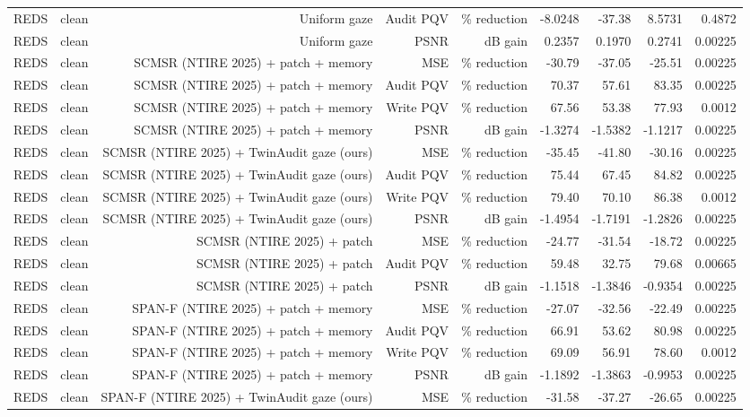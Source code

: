 \begin{table}[t]
\begin{tabular}{llrrrrrrr}
REDS & clean & Uniform gaze & Audit PQV & \% reduction & -8.0248 & -37.38 & 8.5731 & 0.4872 \\
REDS & clean & Uniform gaze & PSNR & dB gain & 0.2357 & 0.1970 & 0.2741 & 0.00225 \\
REDS & clean & SCMSR (NTIRE 2025) + patch + memory & MSE & \% reduction & -30.79 & -37.05 & -25.51 & 0.00225 \\
REDS & clean & SCMSR (NTIRE 2025) + patch + memory & Audit PQV & \% reduction & 70.37 & 57.61 & 83.35 & 0.00225 \\
REDS & clean & SCMSR (NTIRE 2025) + patch + memory & Write PQV & \% reduction & 67.56 & 53.38 & 77.93 & 0.0012 \\
REDS & clean & SCMSR (NTIRE 2025) + patch + memory & PSNR & dB gain & -1.3274 & -1.5382 & -1.1217 & 0.00225 \\
REDS & clean & SCMSR (NTIRE 2025) + TwinAudit gaze (ours) & MSE & \% reduction & -35.45 & -41.80 & -30.16 & 0.00225 \\
REDS & clean & SCMSR (NTIRE 2025) + TwinAudit gaze (ours) & Audit PQV & \% reduction & 75.44 & 67.45 & 84.82 & 0.00225 \\
REDS & clean & SCMSR (NTIRE 2025) + TwinAudit gaze (ours) & Write PQV & \% reduction & 79.40 & 70.10 & 86.38 & 0.0012 \\
REDS & clean & SCMSR (NTIRE 2025) + TwinAudit gaze (ours) & PSNR & dB gain & -1.4954 & -1.7191 & -1.2826 & 0.00225 \\
REDS & clean & SCMSR (NTIRE 2025) + patch & MSE & \% reduction & -24.77 & -31.54 & -18.72 & 0.00225 \\
REDS & clean & SCMSR (NTIRE 2025) + patch & Audit PQV & \% reduction & 59.48 & 32.75 & 79.68 & 0.00665 \\
REDS & clean & SCMSR (NTIRE 2025) + patch & PSNR & dB gain & -1.1518 & -1.3846 & -0.9354 & 0.00225 \\
REDS & clean & SPAN-F (NTIRE 2025) + patch + memory & MSE & \% reduction & -27.07 & -32.56 & -22.49 & 0.00225 \\
REDS & clean & SPAN-F (NTIRE 2025) + patch + memory & Audit PQV & \% reduction & 66.91 & 53.62 & 80.98 & 0.00225 \\
REDS & clean & SPAN-F (NTIRE 2025) + patch + memory & Write PQV & \% reduction & 69.09 & 56.91 & 78.60 & 0.0012 \\
REDS & clean & SPAN-F (NTIRE 2025) + patch + memory & PSNR & dB gain & -1.1892 & -1.3863 & -0.9953 & 0.00225 \\
REDS & clean & SPAN-F (NTIRE 2025) + TwinAudit gaze (ours) & MSE & \% reduction & -31.58 & -37.27 & -26.65 & 0.00225 \\

\end{tabular}
\end{table}

